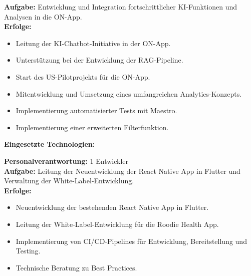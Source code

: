 \documentclass[10pt,a4paper,normalphoto]{altacv}
\begin{document}
\begin{fullwidth}
\vspace{2em}

\textbf{Aufgabe:} Entwicklung und Integration fortschrittlicher KI-Funktionen und Analysen in die ON-App.\\
\textbf{Erfolge:}
\begin{itemize}
    \item Leitung der KI-Chatbot-Initiative in der ON-App.
    \item Unterstützung bei der Entwicklung der RAG-Pipeline.
    \item Start des US-Pilotprojekts für die ON-App.
    \item Mitentwicklung und Umsetzung eines umfangreichen Analytics-Konzepts.
    \item Implementierung automatisierter Tests mit Maestro.
    \item Implementierung einer erweiterten Filterfunktion.
\end{itemize}

\textbf{Eingesetzte Technologien:}\\[0.4em]

\newpage
\textbf{Personalverantwortung:} 1 Entwickler\\ 
\textbf{Aufgabe:} Leitung der Neuentwicklung der React Native App in Flutter und Verwaltung der White-Label-Entwicklung.\\
\textbf{Erfolge:}
\begin{itemize}
    \item Neuentwicklung der bestehenden React Native App in Flutter.
    \item Leitung der White-Label-Entwicklung für die Roodie Health App.
    \item Implementierung von CI/CD-Pipelines für Entwicklung, Bereitstellung und Testing.
    \item Technische Beratung zu Best Practices.
\end{itemize}


\end{fullwidth}
\end{document}
